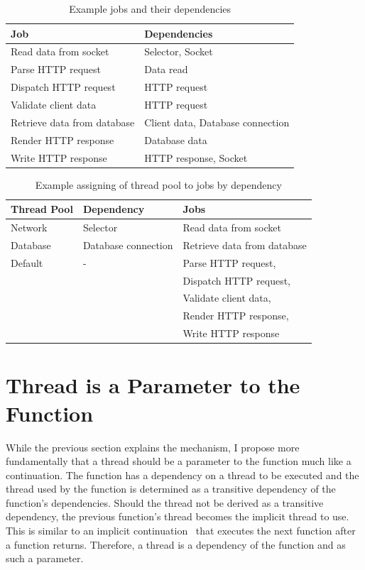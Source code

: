 \documentclass[conference]{ieee/IEEEtran}
\begin{document}
\begin{table}[!t]
\renewcommand{\arraystretch}{1.3}
\caption{Example jobs and their dependencies}
\label{tab:example_request_jobs}
\centering
\begin{tabular}{l||l}
\hline
\bfseries Job & \bfseries Dependencies \\
\hline\hline
Read data from socket & Selector, Socket \\
\hline
Parse HTTP request & Data read \\
\hline
Dispatch HTTP request & HTTP request \\
\hline
Validate client data & HTTP request \\
\hline
Retrieve data from database & Client data, Database connection \\
\hline
Render HTTP response & Database data \\
\hline
Write HTTP response & HTTP response, Socket \\
\hline
\end{tabular}
\end{table}

\begin{table}[!t]
\renewcommand{\arraystretch}{1.3}
\caption{Example assigning of thread pool to jobs by dependency}
\label{tab:example_request_thread_pools}
\centering
\begin{tabular}{l||l||l}
\hline
\bfseries Thread Pool & \bfseries Dependency & \bfseries Jobs \\
\hline\hline
Network & Selector & Read data from socket \\
\hline
Database & Database connection & Retrieve data from database \\
\hline
Default & - & Parse HTTP request, \\
& & Dispatch HTTP request, \\
& & Validate client data, \\ 
& & Render HTTP response, \\
& & Write HTTP response \\
\hline
\end{tabular}
\end{table}

\section{Thread is a Parameter to the Function}
While the previous section explains the mechanism, I propose more fundamentally
that a thread should be a parameter to the function much like a continuation.
The function has a dependency on a thread to be executed and the thread used by
the function is determined as a transitive dependency of the function's
dependencies.  Should the thread not be derived as a transitive dependency, the
previous function's thread becomes the implicit thread to use.  This is similar
to an implicit continuation~\cite{continuations} that executes the next function
after a function returns.  Therefore, a thread is a dependency of the function
and as such a parameter.
\end{document}
